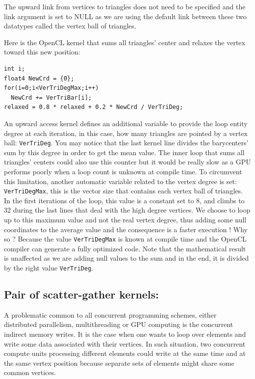 \documentclass[a4paper,12pt]{article}
\begin{document}
The upward link from vertices to triangles does not need to be specified and the link argument is set to NULL as we are using the default link between these two datatypes called the vertex ball of triangles.

Here is the OpenCL kernel that sums all triangles' center and relaxes the vertex toward this new position:
\begin{tt}
\begin{verbatim}
int i;
float4 NewCrd = {0};
for(i=0;i<VerTriDegMax;i++)
  NewCrd += VerTriBar[i];
relaxed = 0.8 * relaxed + 0.2 * NewCrd / VerTriDeg;
\end{verbatim}
\end{tt}
\normalfont

An upward access kernel defines an additional variable to provide the loop entity degree at each iteration, in this case, how many triangles are pointed by a vertex ball: {\tt VerTriDeg}. You may notice that the last kernel line divides the barycenters' sum by this degree in order to get the mean value. The inner loop that sums all triangles' centers could also use this counter but it would be really slow as a GPU performs poorly when a loop count is unknown at compile time. To circumvent this limitation, another automatic variable related to the vertex degree is set: {\tt VerTriDegMax}, this is the vector size that contains each vertex ball of triangles. In the first iterations of the loop, this value is a constant set to 8, and climbs to 32 during the last lines that deal with the high degree vertices. We choose to loop up to this maximum value and not the real vertex degree, thus adding some null coordinates to the average value and the consequence is a faster execution ! Why so ? Because the value {\tt VerTriDegMax} is known at compile time and the OpenCL compiler can generate a fully optimized code. Note that the mathematical result is unaffected as we are adding null values to the sum and in the end, it is divided by the right value {\tt VerTriDeg}.


\subsection{Pair of scatter-gather kernels:}
A problematic common to all concurrent programming schemes, either distributed parallelism, multithreading or GPU computing is the concurrent indirect memory writes. It is the case when one wants to loop over elements and write some data associated with their vertices. In such situation, two concurrent compute units processing different elements could write at the same time and at the same vertex position because separate sets of elements might share some common vertices.
\end{document}
